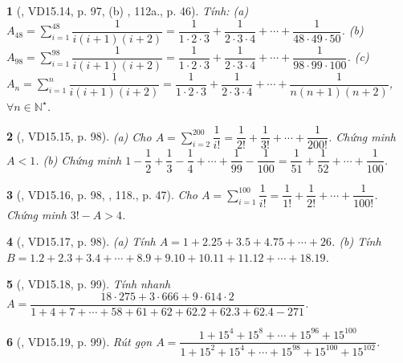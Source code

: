 \documentclass{article}
\newtheorem{baitoan}{}
\begin{document}
\begin{baitoan}[\cite{TLCT_THCS_Toan_6_so_hoc}, VD15.14, p. 97, (b) \cite{Binh_boi_duong_Toan_6_tap_2}, 112a., p. 46]
	Tính: (a) $A_{48} = \sum_{i=1}^{48} \dfrac{1}{i(i + 1)(i + 2)} = \dfrac{1}{1\cdot2\cdot3} + \dfrac{1}{2\cdot3\cdot4} + \cdots + \dfrac{1}{48\cdot49\cdot50}$. (b) $A_{98} = \sum_{i=1}^{98} \dfrac{1}{i(i + 1)(i + 2)} = \dfrac{1}{1\cdot2\cdot3} + \dfrac{1}{2\cdot3\cdot4} + \cdots + \dfrac{1}{98\cdot99\cdot100}$. (c) $A_n = \sum_{i=1}^n \dfrac{1}{i(i + 1)(i + 2)} = \dfrac{1}{1\cdot2\cdot3} + \dfrac{1}{2\cdot3\cdot4} + \cdots + \dfrac{1}{n(n + 1)(n + 2)}$, $\forall n\in\mathbb{N}^\star$.
\end{baitoan}

\begin{baitoan}[\cite{TLCT_THCS_Toan_6_so_hoc}, VD15.15, p. 98]
	(a) Cho $A = \sum_{i=2}^{200} \dfrac{1}{i!} = \dfrac{1}{2!} + \dfrac{1}{3!} + \cdots + \dfrac{1}{200!}$. Chứng minh $A < 1$. (b) Chứng minh $1 - \dfrac{1}{2} + \dfrac{1}{3} - \dfrac{1}{4} + \cdots + \dfrac{1}{99} - \dfrac{1}{100} = \dfrac{1}{51} + \dfrac{1}{52} + \cdots + \dfrac{1}{100}$.
\end{baitoan}

\begin{baitoan}[\cite{TLCT_THCS_Toan_6_so_hoc}, VD15.16, p. 98, \cite{Binh_Toan_6_tap_2}, 118., p. 47]
	Cho $A = \sum_{i=1}^{100} \dfrac{1}{i!} = \dfrac{1}{1!} + \dfrac{1}{2!} + \cdots + \dfrac{1}{100!}$. Chứng minh $3! - A > 4$.
\end{baitoan}

\begin{baitoan}[\cite{TLCT_THCS_Toan_6_so_hoc}, VD15.17, p. 98]
	(a) Tính $A = 1 + 2.25 + 3.5 + 4.75 + \cdots + 26$. (b) Tính $B = 1.2 + 2.3 + 3.4 + \cdots + 8.9 + 9.10 + 10.11 + 11.12 + \cdots + 18.19$.
\end{baitoan}

\begin{baitoan}[\cite{TLCT_THCS_Toan_6_so_hoc}, VD15.18, p. 99]
	Tính nhanh $A = \dfrac{18\cdot275 + 3\cdot666 + 9\cdot614\cdot2}{1 + 4 + 7 + \cdots + 58 + 61 + 62 + 62.2 + 62.3 + 62.4 - 271}$.
\end{baitoan}

\begin{baitoan}[\cite{TLCT_THCS_Toan_6_so_hoc}, VD15.19, p. 99]
	Rút gọn $A = \dfrac{1 + 15^4 + 15^8 + \cdots + 15^{96} + 15^{100}}{1 + 15^2 + 15^4 + \cdots + 15^{98} + 15^{100} + 15^{102}}$.
\end{baitoan}
\end{document}
